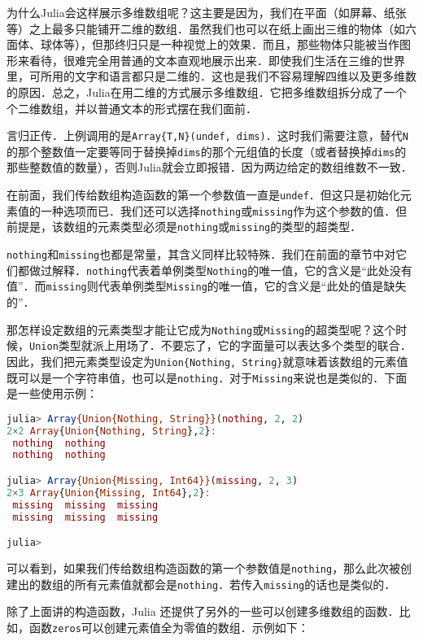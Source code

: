 为什么Julia会这样展示多维数组呢？这主要是因为，我们在平面（如屏幕、纸张等）之上最多只能铺开二维的数组．虽然我们也可以在纸上画出三维的物体（如六面体、球体等），但那终归只是一种视觉上的效果．而且，那些物体只能被当作图形来看待，很难完全用普通的文本直观地展示出来．即使我们生活在三维的世界里，可所用的文字和语言都只是二维的．这也是我们不容易理解四维以及更多维数的原因．总之，Julia在用二维的方式展示多维数组．它把多维数组拆分成了一个个二维数组，并以普通文本的形式摆在我们面前．

言归正传．上例调用的是\verb|Array{T,N}(undef, dims)|．这时我们需要注意，替代\verb|N|的那个整数值一定要等同于替换掉\verb|dims|的那个元组值的长度（或者替换掉\verb|dims|的那些整数值的数量），否则Julia就会立即报错．因为两边给定的数组维数不一致．

在前面，我们传给数组构造函数的第一个参数值一直是\verb|undef|．但这只是初始化元素值的一种选项而已．我们还可以选择\verb|nothing|或\verb|missing|作为这个参数的值．但前提是，该数组的元素类型必须是\verb|nothing|或\verb|missing|的类型的超类型．

\verb|nothing|和\verb|missing|也都是常量，其含义同样比较特殊．我们在前面的章节中对它们都做过解释．\verb|nothing|代表着单例类型\verb|Nothing|的唯一值，它的含义是“此处没有值”．而\verb|missing|则代表单例类型\verb|Missing|的唯一值，它的含义是“此处的值是缺失的”．

那怎样设定数组的元素类型才能让它成为\verb|Nothing|或\verb|Missing|的超类型呢？这个时候，\verb|Union|类型就派上用场了．不要忘了，它的字面量可以表达多个类型的联合．因此，我们把元素类型设定为\verb|Union{Nothing, String}|就意味着该数组的元素值既可以是一个字符串值，也可以是\verb|nothing|．对于\verb|Missing|来说也是类似的．下面是一些使用示例：

\begin{lstlisting}[language=julia]
julia> Array{Union{Nothing, String}}(nothing, 2, 2)
2×2 Array{Union{Nothing, String},2}:
 nothing  nothing
 nothing  nothing

julia> Array{Union{Missing, Int64}}(missing, 2, 3)
2×3 Array{Union{Missing, Int64},2}:
 missing  missing  missing
 missing  missing  missing

julia> 
\end{lstlisting}

可以看到，如果我们传给数组构造函数的第一个参数值是\verb|nothing|，那么此次被创建出的数组的所有元素值就都会是\verb|nothing|．若传入\verb|missing|的话也是类似的．

除了上面讲的构造函数，Julia 还提供了另外的一些可以创建多维数组的函数．比如，函数\verb|zeros|可以创建元素值全为零值的数组．示例如下：

